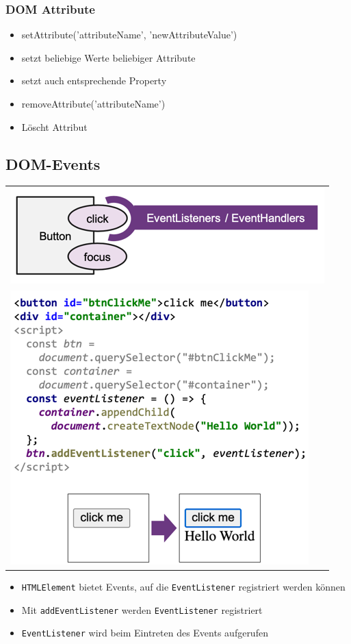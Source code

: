 \documentclass[a4paper, landscape, 8pt]{scrartcl}
\begin{document}
\begin{multicols*}{4}
        \subsubsection{DOM Attribute}
        \begin{itemize}
            \item setAttribute('attributeName', 'newAttributeValue')
            \item setzt beliebige Werte beliebiger Attribute
            \item setzt auch entsprechende Property
            \item removeAttribute('attributeName')
            \item Löscht Attribut
        \end{itemize}

        \subsection{DOM-Events}
        \begin{tabularx}{\columnwidth}{l}
            \includegraphics[scale=0.35]{graphic/06-dom-event-listener} \\
            \includegraphics[scale=0.35]{graphic/07-click-me-example}
        \end{tabularx}
        \begin{itemize}
            \item \texttt{HTMLElement} bietet Events, auf die \texttt{EventListener} registriert werden können
            \item Mit \texttt{addEventListener} werden \texttt{EventListener} registriert
            \item \texttt{EventListener} wird beim Eintreten des Events aufgerufen
        \end{itemize}
        

\end{multicols*}
\end{document}
